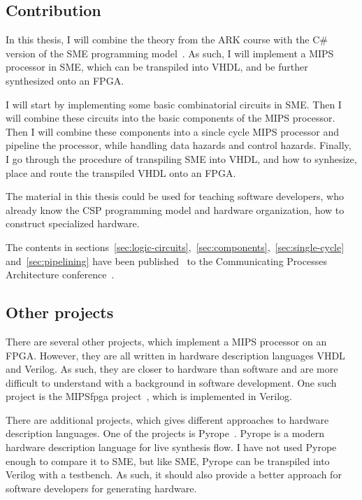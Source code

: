 \subsection*{Contribution}
In this thesis, I will combine the theory from the ARK course with the C\#
version of the SME programming model~\cite{ref:sme-cs}. As such, I will
implement a MIPS processor in SME, which can be transpiled into VHDL, and be
further synthesized onto an FPGA.

I will start by implementing some basic combinatorial circuits in SME. Then I
will combine these circuits into the basic components of the MIPS processor.
Then I will combine these components into a sincle cycle MIPS processor and
pipeline the processor, while handling data hazards and control hazards.
Finally, I go through the procedure of transpiling SME into VHDL, and how to
synhesize, place and route the transpiled VHDL onto an FPGA.

The material in this thesis could be used for teaching software developers, who
already know the CSP programming model and hardware organization, how to
construct specialized hardware.

The contents in sections~\ref{sec:logic-circuits},~\ref{sec:components},~\ref{sec:single-cycle} and~\ref{sec:pipelining} have been
published~\cite{ref:cpa-paper} to the Communicating Processes Architecture
conference~\cite{ref:cpa}.

\subsection*{Other projects}
There are several other projects, which implement a MIPS processor on an FPGA.
However, they are all written in hardware description languages VHDL and
Verilog. As such, they are closer to hardware than software and are more
difficult to understand with a background in software development. One such
project is the MIPSfpga project~\cite{ref:mipsfpga}, which is implemented in
Verilog.

There are additional projects, which gives different approaches to hardware
description languages. One of the projects is Pyrope~\cite{ref:pyrope}. Pyrope
is a modern hardware description language for live synthesis flow. I have not
used Pyrope enough to compare it to SME, but like SME, Pyrope can be transpiled into
Verilog with a testbench. As such, it should also provide a better approach for
software developers for generating hardware.
